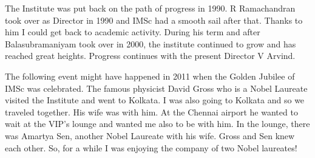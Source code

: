 The Institute was put back on the path of progress in 1990. R 
Ramachandran took over as Director in 1990 and IMSc had a smooth sail 
after that. Thanks to him I could get back to academic activity. During 
his term and after Balasubramaniyam took over in 2000, the institute 
continued to grow and has reached great heights. Progress continues with 
the present Director V Arvind.

The following event might have happened in 2011 when the Golden Jubilee 
of IMSc was celebrated. The famous physicist David Gross who is a Nobel 
Laureate visited the Institute and went to Kolkata. I was also going to 
Kolkata and so we traveled together. His wife was with him. At the 
Chennai airport he wanted to wait at the VIP's lounge and wanted me also 
to be with him. In the lounge, there was Amartya Sen, another Nobel 
Laureate with his wife. Gross and Sen knew each other. So, for a while I 
was enjoying the company of two Nobel laureates!

